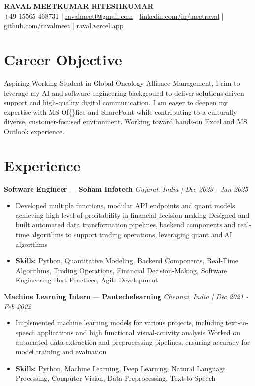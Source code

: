 \documentclass[a4paper,10pt]{article}
\begin{document}
\begin{center}
  {\Large\bfseries RAVAL MEETKUMAR RITESHKUMAR}\\[2pt]
  {\small +49 15565 468731 \;|\; \href{mailto:ravalmeett@gmail.com}{ravalmeett@gmail.com} \;|\; \href{https://www.linkedin.com/in/meetraval/}{linkedin.com/in/meetraval} \;|\; \href{https://github.com/ravalmeet}{github.com/ravalmeet} \;|\; \href{https://raval.vercel.app/}{raval.vercel.app}}
\end{center}
\vspace{-3pt}

\section*{Career Objective}
Aspiring Working Student in Global Oncology Alliance Management, I aim to leverage my AI and software engineering background to deliver solutions-driven support and high-quality digital communication. I am eager to deepen my expertise with MS Of\{\}fice and SharePoint while contributing to a culturally diverse, customer-focused environment. Working toward hands-on Excel and MS Outlook experience.\par

\section*{Experience}
\textbf{Software Engineer} — \textbf{Soham Infotech} \hfill \textit{Gujarat, India \;|\; Dec 2023 - Jan 2025}\par
\vspace{1pt}
\begin{itemize}
  \item Developed multiple functions, modular API endpoints and quant models achieving high level of profitability in financial decision-making Designed and built automated data transformation pipelines, backend components and real-time algorithms to support trading operations, leveraging quant and AI algorithms
  \item \textbf{Skills:} Python, Quantitative Modeling, Backend Components, Real-Time Algorithms, Trading Operations, Financial Decision-Making, Software Engineering Best Practices, Agile Development
\end{itemize}
\vspace{3pt}
\textbf{Machine Learning Intern} — \textbf{Pantechelearning} \hfill \textit{Chennai, India \;|\; Dec 2021 - Feb 2022}\par
\vspace{1pt}
\begin{itemize}
  \item Implemented machine learning models for various projects, including text-to-speech applications and high functional visual-activity analysis Worked on automated data extraction and preprocessing pipelines, ensuring accuracy for model training and evaluation
  \item \textbf{Skills:} Python, Machine Learning, Deep Learning, Natural Language Processing, Computer Vision, Data Preprocessing, Text-to-Speech
\end{itemize}
\end{document}
